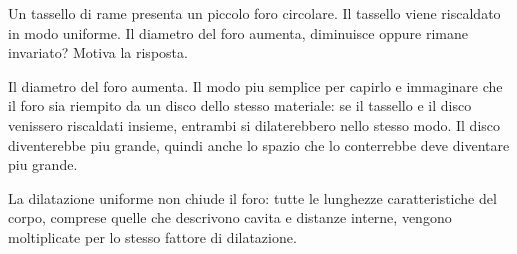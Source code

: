 
\begin{esercizio}
Un tassello di rame presenta un piccolo foro circolare. Il tassello viene
riscaldato in modo uniforme. Il diametro del foro aumenta, diminuisce oppure
rimane invariato? Motiva la risposta.
\end{esercizio}

\begin{soluzione}
Il diametro del foro aumenta. Il modo piu semplice per capirlo e immaginare che
il foro sia riempito da un disco dello stesso materiale: se il tassello e il
disco venissero riscaldati insieme, entrambi si dilaterebbero nello stesso modo.
Il disco diventerebbe piu grande, quindi anche lo spazio che lo conterrebbe deve
diventare piu grande.

La dilatazione uniforme non chiude il foro: tutte le lunghezze caratteristiche
del corpo, comprese quelle che descrivono cavita e distanze interne, vengono
moltiplicate per lo stesso fattore di dilatazione.
\end{soluzione}

